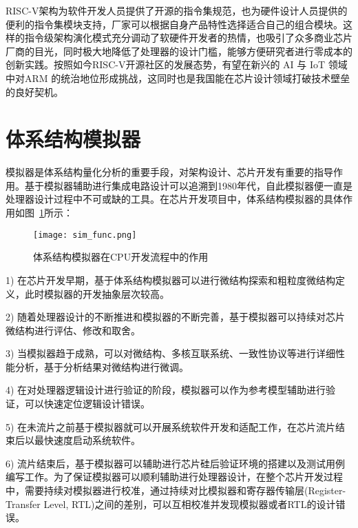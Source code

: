




RISC-V架构为软件开发人员提供了开源的指令集规范，也为硬件设计人员提供的便利的指令集模块支持，厂家可以根据自身产品特性选择适合自己的组合模块。这样的指令级架构演化模式充分调动了软硬件开发者的热情，也吸引了众多商业芯片厂商的目光，同时极大地降低了处理器的设计门槛，能够方便研究者进行零成本的创新实践。按照如今RISC-V开源社区的发展态势，有望在新兴的 AI 与 IoT 领域中对ARM 的统治地位形成挑战\cite{邓紫珊2020基于}，这同时也是我国能在芯片设计领域打破技术壁垒的良好契机。
\section{体系结构模拟器}
模拟器是体系结构量化分析的重要手段，对架构设计、芯片开发有重要的指导作用。基于模拟器辅助进行集成电路设计可以追溯到1980年代\cite{mukherjee2002performance}，自此模拟器便一直是处理器设计过程中不可或缺的工具。在芯片开发项目中，体系结构模拟器的具体作用如图~\ref{fig:sim-func}所示：
\begin{figure}[h]
  \centering
  \texttt{[image: sim\_func.png]}
  \caption{体系结构模拟器在CPU开发流程中的作用}
  \label{fig:sim-func}
\end{figure}


1) 在芯片开发早期，基于体系结构模拟器可以进行微结构探索和粗粒度微结构定义，此时模拟器的开发抽象层次较高。


2) 随着处理器设计的不断推进和模拟器的不断完善，基于模拟器可以持续对芯片微结构进行评估、修改和取舍。


3) 当模拟器趋于成熟，可以对微结构、多核互联系统、一致性协议等进行详细性能分析，基于分析结果对微结构进行微调。


4) 在对处理器逻辑设计进行验证的阶段，模拟器可以作为参考模型辅助进行验证，可以快速定位逻辑设计错误。


5) 在未流片之前基于模拟器就可以开展系统软件开发和适配工作，在芯片流片结束后以最快速度启动系统软件。


6) 流片结束后，基于模拟器可以辅助进行芯片硅后验证环境的搭建以及测试用例编写工作\cite{brooks2000wattch}。为了保证模拟器可以顺利辅助进行处理器设计，在整个芯片开发过程中，需要持续对模拟器进行校准，通过持续对比模拟器和寄存器传输层(Register-Transfer Level, RTL)之间的差别，可以互相校准并发现模拟器或者RTL的设计错误\cite{hourui}。


